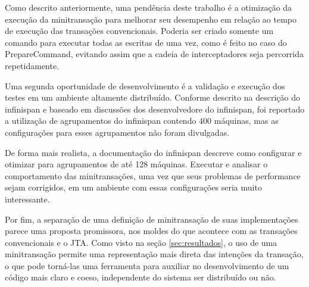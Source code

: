 \documentclass[11pt,twoside,a4paper]{book}
\renewcommand{\chaptermark}[1]{\markboth{\MakeUppercase{#1}}{}}
\begin{document}
Como descrito anteriormente, uma pendência deste trabalho é a otimização da execução da minitransação para melhorar seu desempenho em relação ao tempo de execução das transações convencionais. Poderia ser criado somente um comando para executar todas as escritas de uma vez, como é feito no caso do PrepareCommand, evitando assim que a cadeia de interceptadores seja percorrida repetidamente.

Uma segunda oportunidade de desenvolvimento é a validação e execução dos testes em um ambiente altamente distribuído. Conforme descrito na descrição do infinispan e baseado em discussões dos desenvolvedore do infinispan, foi reportado a utilização de agrupamentos do infinispan contendo 400 máquinas, mas as configurações para esses agrupamentos não foram divulgadas. 

De forma mais realista, a documentação do infinispan descreve como configurar e otimizar para agrupamentos de até 128 máquinas. Executar e analisar o comportamento das minitransações, uma vez que seus problemas de performance sejam corrigidos, em um ambiente com essas configurações seria muito interessante. 

Por fim, a separação de uma definição de minitransação de suas implementações parece uma proposta promissora, nos moldes do que acontece com as transações convencionais e o JTA. Como visto na seção \ref{sec:resultados}, o uso de uma minitransação permite uma representação mais direta das intenções da transação, o que pode torná-las uma ferramenta para auxiliar no desenvolvimento de um código mais claro e coeso, independente do sistema ser distribuído ou não.




\backmatter \singlespacing   %
\end{document}
